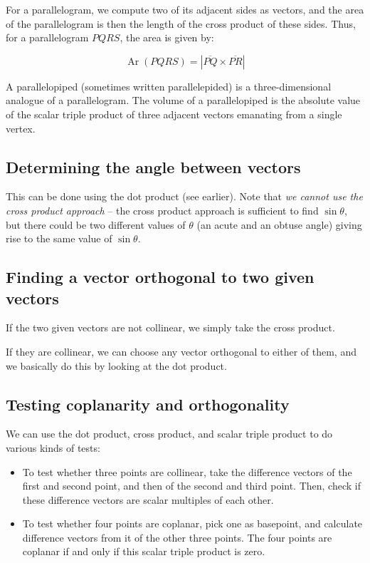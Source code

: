 \documentclass[10pt]{amsart}
\begin{document}
For a parallelogram, we compute two of its adjacent sides as vectors,
and the area of the parallelogram is then the length of the cross
product of these sides. Thus, for a parallelogram $PQRS$, the area is
given by:

$$\operatorname{Ar}(PQRS) = |\overline{PQ} \times \overline{PR}|$$

A parallelopiped (sometimes written parallelepided) is a
three-dimensional analogue of a parallelogram. The volume of a
parallelopiped is the absolute value of the scalar triple product of
three adjacent vectors emanating from a single vertex.

\subsection{Determining the angle between vectors}

This can be done using the dot product (see earlier). Note that {\em
we cannot use the cross product approach} -- the cross product
approach is sufficient to find $\sin \theta$, but there could be two
different values of $\theta$ (an acute and an obtuse angle) giving
rise to the same value of $\sin \theta$.

\subsection{Finding a vector orthogonal to two given vectors}

If the two given vectors are not collinear, we simply take the cross
product.

If they are collinear, we can choose any vector orthogonal to either
of them, and we basically do this by looking at the dot product.

\subsection{Testing coplanarity and orthogonality}

We can use the dot product, cross product, and scalar triple product
to do various kinds of tests:

\begin{itemize}
\item To test whether three points are collinear, take the difference
  vectors of the first and second point, and then of the second and
  third point. Then, check if these difference vectors are scalar
  multiples of each other.
\item To test whether four points are coplanar, pick one as basepoint,
  and calculate difference vectors from it of the other three
  points. The four points are coplanar if and only if this scalar
  triple product is zero.
\end{itemize}
\end{document}
